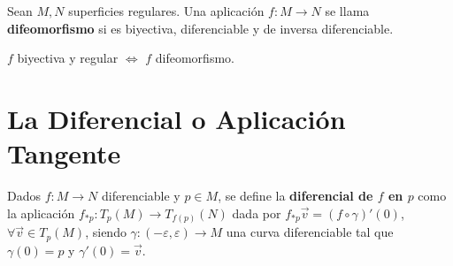 \documentclass[twoside]{report}
\begin{document}
\begin{defi}
Sean $M,N$ superficies regulares. Una aplicación $f:M\to N$ se llama \textbf{difeomorfismo} si es biyectiva, diferenciable y de inversa diferenciable.
\end{defi}

\begin{nota}
$f$ biyectiva y regular $\Leftrightarrow$ $f$ difeomorfismo.
\end{nota}

\section{La Diferencial o Aplicación Tangente}

\begin{defi}
Dados $f:M \to N$ diferenciable y $p\in M$, se define la \textbf{diferencial de $f$ en $p$} como la aplicación $f_{*p}: T_p (M)\rightarrow T_{f(p)}(N)$ dada por $f_{*p}\overrightarrow{v}=(f\circ\gamma)'(0)$, $\forall \overrightarrow{v}\in T_p(M)$, siendo $\gamma:(-\varepsilon,\varepsilon)\to M$ una curva diferenciable tal que $\gamma(0)=p$ y $\gamma'(0)=\overrightarrow{v}$.
\end{defi}
\end{document}
